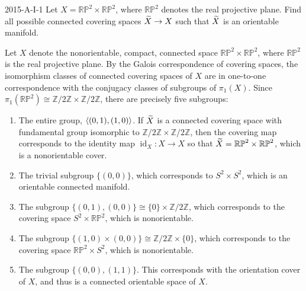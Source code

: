 \documentclass{article}
\begin{document}
	\begin{prb}{2015-A-I-1}
		Let $X = \mathbb{RP}^2 \times \mathbb{RP}^2$, where $\mathbb{RP}^2$ denotes the real projective plane. Find all possible connected covering spaces $\widetilde{X} \to X$ such that $\widetilde{X}$ is an orientable manifold. 
	\end{prb}
	Let $X$ denote the nonorientable, compact, connected space $\mathbb{RP}^2 \times \mathbb{RP}^2$, where $\mathbb{RP}^2$ is the real projective plane. By the Galois correspondence of covering spaces, the isomorphism classes of connected covering spaces of $X$ are in one-to-one correspondence with the conjugacy classes of subgroups of $\pi_1(X)$. Since $\pi_1(\mathbb{RP}^2) \cong \mathbb{Z}/2\mathbb{Z} \times \mathbb{Z}/2\mathbb{Z}$, there are precisely five subgroups: 
	\begin{enumerate}[itemsep =-2pt,label = (\arabic{*})]
		\item The entire group, $\braket{(0,1),(1,0)}$. If $\widetilde{X}$ is a connected covering space with fundamental group isomorphic to $\mathbb{Z}/2\mathbb{Z} \times \mathbb{Z}/2\mathbb{Z}$, then the covering map corresponds to the identity map $\operatorname{id}_{X}: X \to X$ so that $\widetilde{X} = \mathbb{RP}^2 \times \mathbb{RP}^2$, which is a nonorientable cover. 
		\item The trivial subgroup $\{(0,0)\}$, which corresponds to $S^2 \times S^2$, which is an orientable connected manifold. 
		\item The subgroup $\{(0,1), (0,0)\} \cong \{0\} \times \mathbb{Z}/2\mathbb{Z}$, which corresponds to the covering space $S^2 \times \mathbb{RP}^2$, which is nonorientable. 
		\item The subgroup $\{(1,0) \times (0,0)\} \cong \mathbb{Z}/2\mathbb{Z} \times \{0\}$, which corresponds to the covering space $\mathbb{RP}^2 \times S^2$, which is nonorientable. 
		\item The subgroup $\{(0,0),(1,1)\}$. This corresponds with the orientation cover of $X$, and thus is a connected orientable space of $X$. 
	\end{enumerate}
	
\end{document}
